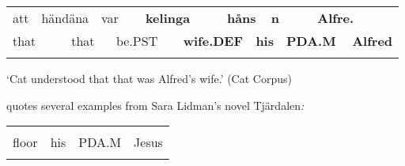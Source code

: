 \begin{tabular}{llllllllllllll}
\lsptoprule
att & \multicolumn{2}{l}{händäna

} & \multicolumn{2}{l}{var

} & \multicolumn{2}{l}{{\bfseries kelinga}

} & \multicolumn{2}{l}{{\bfseries håns}

} & \multicolumn{2}{l}{{\bfseries n}

} & \multicolumn{2}{l}{{\bfseries Alfre.}

} & \\
\multicolumn{2}{l}{that

} & \multicolumn{2}{l}{that

} & \multicolumn{2}{l}{be.PST

} & \multicolumn{2}{l}{{\bfseries wife.DEF}

} & \multicolumn{2}{l}{{\bfseries his}

} & \multicolumn{2}{l}{{\bfseries PDA.M}

} & \multicolumn{2}{l}{{\bfseries Alfred}

}\\
\lspbottomrule
\end{tabular}

\begin{styleTranslation}
 ‘Cat understood that that was Alfred’s wife.’ (Cat Corpus)

\end{styleTranslation}

\citet[51]{Dahlstedt1971} quotes several examples from Sara Lidman’s novel Tjärdalen\textit{:}

\begin{listWWNumileveli}
\item {}

\end{listWWNumileveli}

\begin{listWWNumlxxxleveli}
\item {}

\end{listWWNumlxxxleveli}

\begin{tabular}{llll}
\lsptoprule
\multicolumn{4}{l}{golvet

}\\
floor & his & PDA.M & Jesus\\
\lspbottomrule
\end{tabular}

